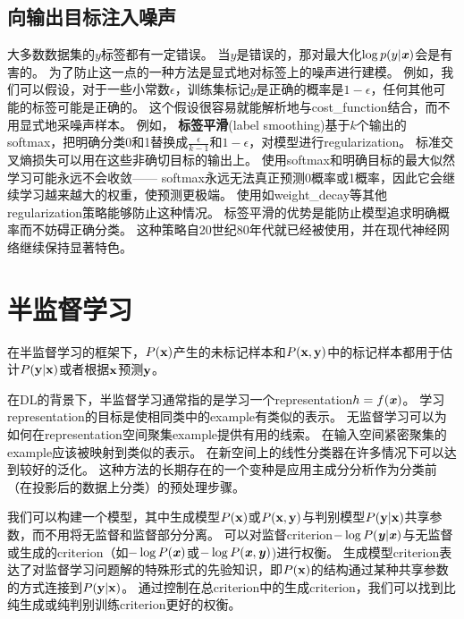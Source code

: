 
\subsection{向输出目标注入噪声}
\label{sec:injecting_noise_at_the_output_targets}
大多数数据集的$y$标签都有一定错误。
当$y$是错误的，那对最大化$\log p(y | \boldsymbol{\mathit{x}})$会是有害的。
为了防止这一点的一种方法是显式地对标签上的噪声进行建模。
例如，我们可以假设，对于一些小常数$\epsilon$，训练集标记$y$是正确的概率是$1-\epsilon$，任何其他可能的标签可能是正确的。
这个假设很容易就能解析地与\gls{cost_function}结合，而不用显式地采噪声样本。
例如， \textbf{标签平滑}(label smoothing)基于$k$个输出的\gls{softmax}，把明确分类0和1替换成$\frac{\epsilon}{k-1}$和$1-\epsilon$，对模型进行\gls{regularization}。
标准交叉熵损失可以用在这些非确切目标的输出上。
使用\gls{softmax}和明确目标的最大似然学习可能永远不会收敛——
\gls{softmax}永远无法真正预测0概率或1概率，因此它会继续学习越来越大的权重，使预测更极端。
使用如\gls{weight_decay}等其他\gls{regularization}策略能够防止这种情况。
标签平滑的优势是能防止模型追求明确概率而不妨碍正确分类。
这种策略自20世纪80年代就已经被使用，并在现代神经网络继续保持显著特色\citep{Szegedy-et-al-2015}。


\section{半监督学习}
\label{sec:semi_supervised_learning}
在半监督学习的框架下，$P(\mathbf{x})$产生的未标记样本和$P(\mathbf{x}, \mathbf{y})$中的标记样本都用于估计$P(\mathbf{y} | \mathbf{x})$或者根据$\mathbf{x}$预测$\mathbf{y}$。

在\gls{DL}的背景下，半监督学习通常指的是学习一个\gls{representation}$h = f(\boldsymbol{\mathit{x}})$。 
学习\gls{representation}的目标是使相同类中的\gls{example}有类似的表示。
无监督学习可以为如何在\gls{representation}空间聚集\gls{example}提供有用的线索。
在输入空间紧密聚集的\gls{example}应该被映射到类似的表示。
在新空间上的线性分类器在许多情况下可以达到较好的泛化\citep{Belkin+Niyogi-2002,Chapelle+al-2003}。
这种方法的长期存在的一个变种是应用主成分分析作为分类前（在投影后的数据上分类）的预处理步骤。

我们可以构建一个模型，其中生成模型$P(\mathbf{x})$或$P(\mathbf{x}, \mathbf{y})$与判别模型$P(\mathbf{y} | \mathbf{x})$共享参数，而不用将无监督和监督部分分离。
可以对监督\gls{criterion}$-\log P(\boldsymbol{\mathit{y}} | \boldsymbol{\mathit{x}})$与无监督或生成的\gls{criterion}（如$-\log P(\boldsymbol{\mathit{x}})$或$-\log P(\boldsymbol{\mathit{x}}, \boldsymbol{\mathit{y}})$)进行权衡。
生成模型\gls{criterion}表达了对监督学习问题解的特殊形式的先验知识\citep{LasserreJ2006}，即$P(\mathbf{x})$的结构通过某种共享参数的方式连接到$P(\mathbf{y} | \mathbf{x})$。
通过控制在总\gls{criterion}中的生成\gls{criterion}，我们可以找到比纯生成或纯判别训练\gls{criterion}更好的权衡\citep{LasserreJ2006,Larochelle2008}。

